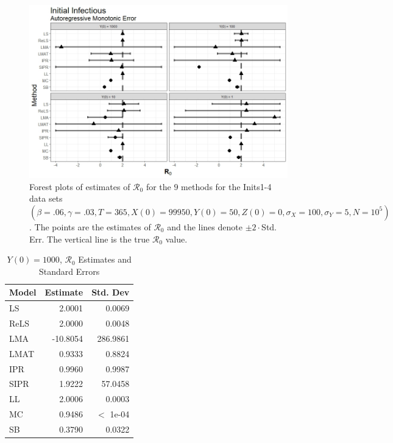\documentclass[12pt]{article}
\newcommand{\xxsir}{\ensuremath{9} } %
\newcommand{\rr}{\ensuremath{\mathcal{R}_0}}
\begin{document}
\begin{figure}[H]
	\centering
	\includegraphics[scale=0.5]{images/start_arm.jpeg}
	\caption{Forest plots of estimates of $\rr$ for the \xxsir methods for the Inits1-4 data sets $(\beta=.06, \gamma=.03, T=365, X(0)=99950, Y(0)=50, Z(0)=0, \sigma_X=100, \sigma_Y=5, N=10^5)$.  The points are the estimates of $\rr$ and the lines denote $\pm 2\cdot $Std. Err.  The vertical line is the true $\rr$ value.}
\end{figure}


\begin{table}[H]
	
	\centering
	\begin{tabular}[t]{l|r|r}
		\hline
		Model & Estimate & Std. Dev\\
		\hline
		LS & 2.0001 & 0.0069\\
		\hline
		ReLS & 2.0000 & 0.0048\\
		\hline
		LMA & -10.8054 & 286.9861\\
		\hline
		LMAT & 0.9333 & 0.8824\\
		\hline
		IPR & 0.9960 & 0.9987\\
		\hline
		SIPR & 1.9222 & 57.0458\\
		\hline
		LL & 2.0006 & 0.0003\\
		\hline
		MC & 0.9486 & $<$ 1e-04\\
		\hline
		SB & 0.3790 & 0.0322\\
		\hline
	\end{tabular}
	\caption{$Y(0) = 1000$, $\rr$ Estimates and Standard Errors}
\end{table}
\end{document}
